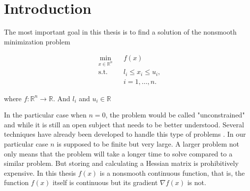 
\chapter{Introduction} %

\label{Chapter1} %


The most important goal in this thesis is to find a solution of the nonsmooth minimization problem

\begin{equation} \label{mainproblem}
  \begin{aligned}
    & \underset{x \in \mathbb{R}^n}{\text{min}}
    & & f(x) \\
    & \text{s.t.}
    & & l_i \leq x_i \leq u_i , \; \\
    & & & i = 1, \ldots, n.
  \end{aligned}
\end{equation}

where $f \colon \mathbb{R}^n \to \mathbb{R}$.  And $l_i$ and $u_i \in \mathbb{R}$

In the particular case when $n = 0$, the problem would be called "unconstrained" and while it is still an open subject that needs to be better understood.  Several techniques have already been developed to handle this type of problems \citep{unconstrained}.  In our particular case $n$ is supposed to be finite but very large. A larger problem not only means that the problem will take a longer time to solve compared to a similar problem. But storing and calculating a Hessian matrix is prohibitively expensive.  In this thesis $f(x)$ is a nonsmooth continuous function, that is, the function $f(x)$ itself is continuous but its gradient $\nabla f(x)$ is not.

